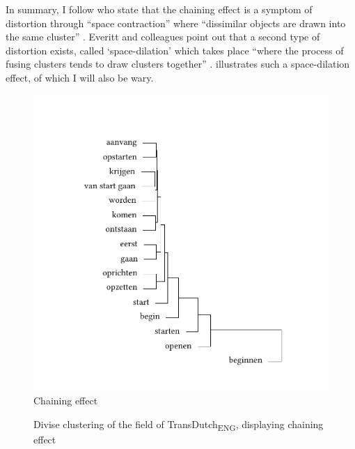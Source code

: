 In summary, I follow \citet[92]{everitt_cluster_2011} who state that the chaining effect is a symptom of distortion through “space contraction” where “dissimilar objects are drawn into the same cluster” \citep[92]{everitt_cluster_2011}. Everitt and colleagues point out that a second type of distortion exists, called ‘space-dilation’ which takes place “where the process of fusing clusters tends to draw clusters together” \citet[92]{everitt_cluster_2011}.  illustrates such a space-dilation effect, of which I will also be wary.

\begin{figure}%
\includegraphics[height=.4\textheight]{figures/tree28.pdf}
Chaining effect
\caption{\label{fig:3:28}Divise clustering of the field of TransDutch\textsubscript{ENG}, displaying chaining effect}
\end{figure}

